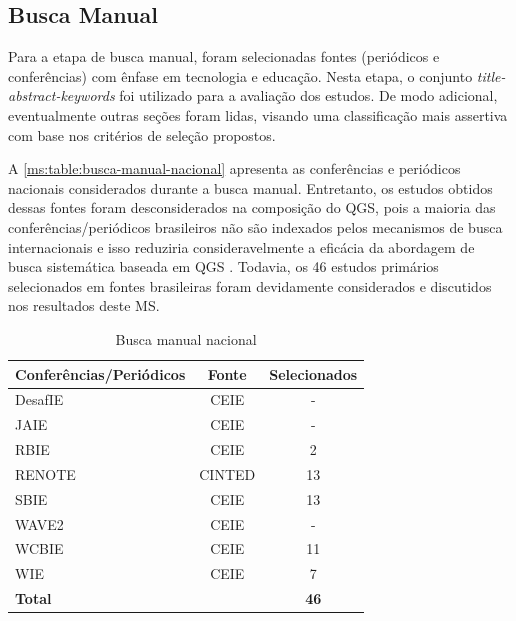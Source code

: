 \subsection{Busca Manual}
\label{ms:conducao-busca-manual}

Para a etapa de busca manual, foram selecionadas fontes (periódicos e conferências) com ênfase em tecnologia e educação. %
Nesta etapa, o conjunto \textit{title-abstract-keywords} foi utilizado para a avaliação dos estudos. De modo adicional, eventualmente outras seções foram lidas, visando uma classificação mais assertiva com base nos critérios de seleção propostos.

A \autoref{ms:table:busca-manual-nacional} apresenta as conferências e periódicos nacionais considerados durante a busca manual. Entretanto, os estudos obtidos dessas fontes foram desconsiderados na composição do QGS, pois a maioria das conferências/periódicos brasileiros não são indexados pelos mecanismos de busca internacionais e isso reduziria consideravelmente a eficácia da abordagem de busca sistemática baseada em QGS \cite{Zhang2011}. Todavia, os 46 estudos primários selecionados em fontes brasileiras foram devidamente considerados e discutidos nos resultados deste MS. 

\begin{table}[htbp]
\centering
\caption{Busca manual nacional}
\label{ms:table:busca-manual-nacional}
\begin{tabular}{lcc}
\hline
\textbf{Conferências/Periódicos} & \textbf{Fonte} & \textbf{Selecionados} \\ \hline
DesafIE                          & CEIE           & -                     \\
JAIE                             & CEIE           & -                     \\
RBIE                             & CEIE           & 2                     \\
RENOTE                           & CINTED         & 13                    \\
SBIE                             & CEIE           & 13                    \\
WAVE2                            & CEIE           & -                     \\
WCBIE                            & CEIE           & 11                    \\
WIE                              & CEIE           & 7                     \\
\multicolumn{2}{l}{\textbf{Total}}                & \textbf{46}           \\ \hline
\end{tabular}
\fautor
\end{table}

